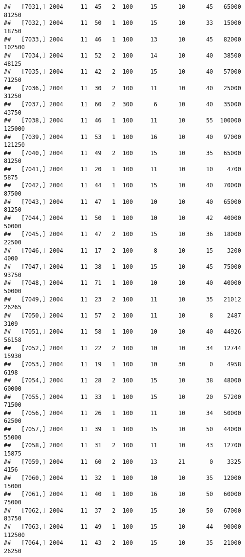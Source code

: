 \documentclass{article}\usepackage[]{graphicx}\usepackage[]{color}
\makeatletter
\newenvironment{kframe}{%
 \def\at@end@of@kframe{}%
 \ifinner\ifhmode%
  \def\at@end@of@kframe{\end{minipage}}%
  \begin{minipage}{\columnwidth}%
 \fi\fi%
 \def\FrameCommand##1{\hskip\@totalleftmargin \hskip-\fboxsep
 \colorbox{shadecolor}{##1}\hskip-\fboxsep
     \hskip-\linewidth \hskip-\@totalleftmargin \hskip\columnwidth}%
 \MakeFramed {\advance\hsize-\width
   \@totalleftmargin\z@ \linewidth\hsize
   \@setminipage}}%
 {\par\unskip\endMakeFramed%
 \at@end@of@kframe}
\newenvironment{knitrout}{}{} %
\makeatother
\begin{document}
\begin{knitrout}
\begin{kframe}
\begin{verbatim}
##   [7031,] 2004     11  45   2  100     15      10      45   65000   81250
##   [7032,] 2004     11  50   1  100     15      10      33   15000   18750
##   [7033,] 2004     11  46   1  100     13      10      45   82000  102500
##   [7034,] 2004     11  52   2  100     14      10      40   38500   48125
##   [7035,] 2004     11  42   2  100     15      10      40   57000   71250
##   [7036,] 2004     11  30   2  100     11      10      40   25000   31250
##   [7037,] 2004     11  60   2  300      6      10      40   35000   43750
##   [7038,] 2004     11  46   1  100     11      10      55  100000  125000
##   [7039,] 2004     11  53   1  100     16      10      40   97000  121250
##   [7040,] 2004     11  49   2  100     15      10      35   65000   81250
##   [7041,] 2004     11  20   1  100     11      10      10    4700    5875
##   [7042,] 2004     11  44   1  100     15      10      40   70000   87500
##   [7043,] 2004     11  47   1  100     10      10      40   65000   81250
##   [7044,] 2004     11  50   1  100     10      10      42   40000   50000
##   [7045,] 2004     11  47   2  100     15      10      36   18000   22500
##   [7046,] 2004     11  17   2  100      8      10      15    3200    4000
##   [7047,] 2004     11  38   1  100     15      10      45   75000   93750
##   [7048,] 2004     11  71   1  100     10      10      40   40000   50000
##   [7049,] 2004     11  23   2  100     11      10      35   21012   26265
##   [7050,] 2004     11  57   2  100     11      10       8    2487    3109
##   [7051,] 2004     11  58   1  100     10      10      40   44926   56158
##   [7052,] 2004     11  22   2  100     10      10      34   12744   15930
##   [7053,] 2004     11  19   1  100     10      30       0    4958    6198
##   [7054,] 2004     11  28   2  100     15      10      38   48000   60000
##   [7055,] 2004     11  33   1  100     15      10      20   57200   71500
##   [7056,] 2004     11  26   1  100     11      10      34   50000   62500
##   [7057,] 2004     11  39   1  100     15      10      50   44000   55000
##   [7058,] 2004     11  31   2  100     11      10      43   12700   15875
##   [7059,] 2004     11  60   2  100     13      21       0    3325    4156
##   [7060,] 2004     11  32   1  100     10      10      35   12000   15000
##   [7061,] 2004     11  40   1  100     16      10      50   60000   75000
##   [7062,] 2004     11  37   2  100     15      10      50   67000   83750
##   [7063,] 2004     11  49   1  100     15      10      44   90000  112500
##   [7064,] 2004     11  43   2  100     15      10      35   21000   26250

\end{verbatim}
\end{kframe}
\end{knitrout}
\end{document}
